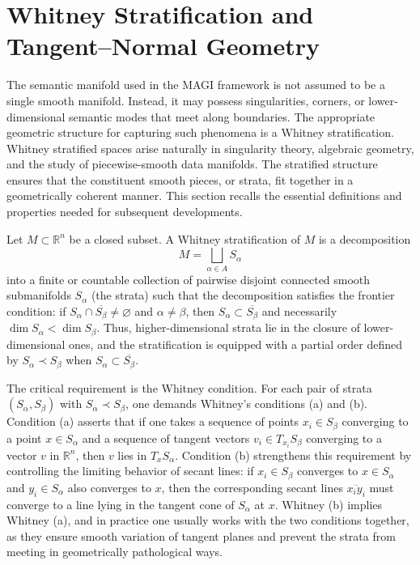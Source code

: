 \documentclass[12pt]{article}
\begin{document}
\section{Whitney Stratification and Tangent--Normal Geometry}

The semantic manifold used in the MAGI framework is not assumed to be a single smooth manifold. Instead, it may possess singularities, corners, or lower-dimensional semantic modes that meet along boundaries. The appropriate geometric structure for capturing such phenomena is a Whitney stratification. Whitney stratified spaces arise naturally in singularity theory, algebraic geometry, and the study of piecewise-smooth data manifolds. The stratified structure ensures that the constituent smooth pieces, or strata, fit together in a geometrically coherent manner. This section recalls the essential definitions and properties needed for subsequent developments.

Let $M \subset \mathbb{R}^n$ be a closed subset. A Whitney stratification of $M$ is a decomposition
\[
M = \bigsqcup_{\alpha \in A} S_\alpha
\]
into a finite or countable collection of pairwise disjoint connected smooth submanifolds $S_\alpha$ (the strata) such that the decomposition satisfies the frontier condition: if $S_\alpha \cap \overline{S_\beta} \neq \varnothing$ and $\alpha \neq \beta$, then $S_\alpha \subset \overline{S_\beta}$ and necessarily $\dim S_\alpha < \dim S_\beta$. Thus, higher-dimensional strata lie in the closure of lower-dimensional ones, and the stratification is equipped with a partial order defined by $S_\alpha \prec S_\beta$ when $S_\alpha \subset \overline{S_\beta}$.

The critical requirement is the Whitney condition. For each pair of strata $(S_\alpha, S_\beta)$ with $S_\alpha \prec S_\beta$, one demands Whitney's conditions (a) and (b). Condition (a) asserts that if one takes a sequence of points $x_i \in S_\beta$ converging to a point $x \in S_\alpha$ and a sequence of tangent vectors $v_i \in T_{x_i} S_\beta$ converging to a vector $v$ in $\mathbb{R}^n$, then $v$ lies in $T_x S_\alpha$. Condition (b) strengthens this requirement by controlling the limiting behavior of secant lines: if $x_i \in S_\beta$ converges to $x \in S_\alpha$ and $y_i \in S_\alpha$ also converges to $x$, then the corresponding secant lines $\overline{x_i y_i}$ must converge to a line lying in the tangent cone of $S_\alpha$ at $x$. Whitney (b) implies Whitney (a), and in practice one usually works with the two conditions together, as they ensure smooth variation of tangent planes and prevent the strata from meeting in geometrically pathological ways.
\end{document}
